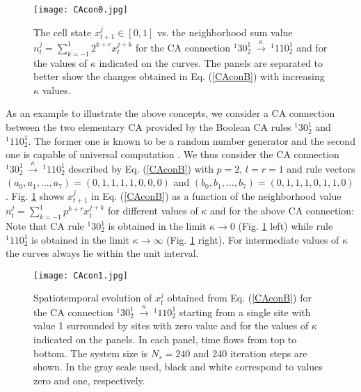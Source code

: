 \documentclass[aps,pre,preprint,floatfix]{revtex4}
\theoremstyle{plain} \newtheorem{defi}{Definition}[section]
\theoremstyle{plain} \newtheorem{prop}{Proposition}[section]
\theoremstyle{plain} \newtheorem{theor}{Theorem}[section]
\theoremstyle{plain} \newtheorem{lemma}{Lemma}[section]
\theoremstyle{plain} \newtheorem*{corol}{Corollary}
\theoremstyle{remark} \newtheorem*{rem}{Remark}
\theoremstyle{plain} \newtheorem{exer}{Exercise}[section]
\theoremstyle{remark} \newtheorem*{ans}{Answer}
\begin{document}
\begin{figure}
\texttt{[image: CAcon0.jpg]}
\caption{\scriptsize{The cell state $x_{t+1}^{j}\in [0,1]$ vs. the neighborhood sum value $n_{t}^{j}=\sum_{k=-1}^{1}2^{k+r}x_{t}^{j+k}$ for the CA connection $^{1}30_{2}^{1}\ \xrightarrow{\kappa}\ ^{1}110_{2}^{1}$ and for the values of $\kappa$ indicated on the curves. The panels are separated to better show the changes obtained in Eq. (\ref{CAconB})  with increasing $\kappa$ values.}} \label{1}
\end{figure}


As an example to illustrate the above concepts, we consider a CA connection between the two elementary CA provided by the Boolean CA rules $^{1}30^{1}_2$ and $^{1}110^{1}_2$. The former one is known to be a random number generator \cite{Wolfram, Wolfram7} and the second one is capable of universal computation \cite{Wolfram, Cook}. We thus consider the CA connection $^{1}30_{2}^{1}\ \xrightarrow{\kappa}\ ^{1}110_{2}^{1}$ described by Eq. (\ref{CAconB}) with $p=2$, $l=r=1$ and rule vectors $(a_0,a_1,\ldots,a_7)=(0,1,1,1,1,0,0,0)$ and $(b_0,b_1,\ldots,b_7)=(0,1,1,1,0,1,1,0)$.  
Fig. \ref{1} shows $x_{t+1}^{j}$ in Eq. (\ref{CAconB}) as a function of the neighborhood value $n_{t}^{j}=\sum_{k=-1}^{1}p^{k+r}x_{t}^{j+k}$ for different values of $\kappa$ and for the above CA connection: Note that CA rule $^{1}30_{2}^{1}$ is obtained in the limit $\kappa \to 0$ (Fig. \ref{1} left) while rule $^{1}110_{2}^{1}$ is obtained in the limit $\kappa \to \infty$ (Fig. \ref{1} right). For intermediate values of $\kappa$ the curves always lie within the unit interval. 



\begin{figure}
\texttt{[image: CAcon1.jpg]}
\caption{\scriptsize{Spatiotemporal evolution of $x_t^j$ obtained from Eq. (\ref{CAconB}) for the CA connection $^{1}30_{2}^{1}\ \xrightarrow{\kappa}\ ^{1}110_{2}^{1}$ starting from a single site with value 1 surrounded by sites with zero value and for the values of $\kappa$ indicated on the panels. In each panel, time flows from top to bottom. The system size is $N_s=240$ and 240 iteration steps are shown. In the gray scale used, black and white correspond to values zero and one, respectively.}} \label{2}
\end{figure}
\end{document}
